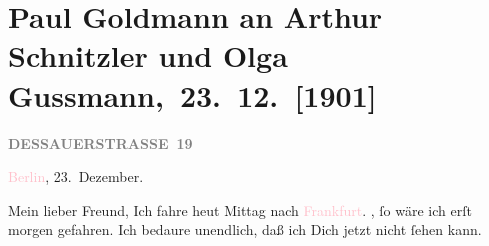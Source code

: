 

\renewcommand{\erwaehntePersonen}{Personen: Josef Rosengart, Olga Schnitzler, Heinrich Schnitzler}
\renewcommand{\erwaehnteOrte}{Orte: Berlin, Dessauer Straße, Deutsches Theater Berlin, Frankfurt am Main, Reuterweg, Wien}
\renewcommand{\erwaehnteWerke}{Werke: Die Frau mit dem Dolche, Die letzten Masken, Lebendige Stunden, Lebendige Stunden. Vier Einakter}
\section[ Paul Goldmann an Arthur Schnitzler und Olga Gussmann, 23. 12. {[}1901{]}]{Paul Goldmann an Arthur Schnitzler und Olga
               Gussmann, 23. 12. {[}1901{]}}
\nopagebreak{}
\rehead{ }\normalsize\beginnumbering{}
\toendnotes[C]{\smallbreak\pagebreak[2]}
\toendnotes[C]{\smallbreak}
\pstart
           \noindent{}\raggedleft{}{\pb}\textcolor{pink}{\textcolor{gray}{\textbf{DESSAUERSTRASSE 19}}}{}\ledrightnote{\textcolor{pink}{Dessauer Straße}}\pend
           
\pstart
           \textcolor{pink}{Berlin}{}\ledrightnote{\textcolor{pink}{Berlin}}, 23. Dezember.\pend
           
\pstart\center{}Mein lieber Freund,\pend
\pstart
           Ich fahre heut{ }Mittag nach \textcolor{pink}{Frankfurt}{}\ledrightnote{\textcolor{pink}{Frankfurt am Main}}. \label{K_L03097-1v}\label{K_L03097-1h}, ſo wäre ich erſt morgen gefahren. Ich bedaure
               unendlich, daß ich Dich jetzt nicht ſehen kann.\pend
           
